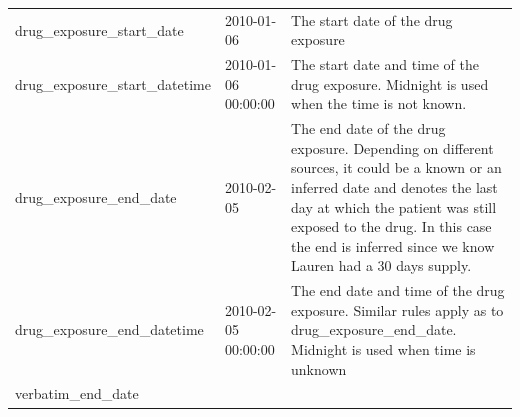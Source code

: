 \documentclass[]{book}
\begin{document}
\begin{longtable}[]{@{}lll@{}}
\begin{minipage}[t]{0.30\columnwidth}
drug\_exposure\_start\_date\strut
\end{minipage} & \begin{minipage}[t]{0.14\columnwidth}\raggedright
2010-01-06\strut
\end{minipage} & \begin{minipage}[t]{0.48\columnwidth}\raggedright
The start date of the drug exposure\strut
\end{minipage}\tabularnewline
\begin{minipage}[t]{0.30\columnwidth}\raggedright
drug\_exposure\_start\_datetime\strut
\end{minipage} & \begin{minipage}[t]{0.14\columnwidth}\raggedright
2010-01-06 00:00:00\strut
\end{minipage} & \begin{minipage}[t]{0.48\columnwidth}\raggedright
The start date and time of the drug exposure. Midnight is used when the time is not known.\strut
\end{minipage}\tabularnewline
\begin{minipage}[t]{0.30\columnwidth}\raggedright
drug\_exposure\_end\_date\strut
\end{minipage} & \begin{minipage}[t]{0.14\columnwidth}\raggedright
2010-02-05\strut
\end{minipage} & \begin{minipage}[t]{0.48\columnwidth}\raggedright
The end date of the drug exposure. Depending on different sources, it could be a known or an inferred date and denotes the last day at which the patient was still exposed to the drug. In this case the end is inferred since we know Lauren had a 30 days supply.\strut
\end{minipage}\tabularnewline
\begin{minipage}[t]{0.30\columnwidth}\raggedright
drug\_exposure\_end\_datetime\strut
\end{minipage} & \begin{minipage}[t]{0.14\columnwidth}\raggedright
2010-02-05 00:00:00\strut
\end{minipage} & \begin{minipage}[t]{0.48\columnwidth}\raggedright
The end date and time of the drug exposure. Similar rules apply as to drug\_exposure\_end\_date. Midnight is used when time is unknown\strut
\end{minipage}\tabularnewline
\begin{minipage}[t]{0.30\columnwidth}\raggedright
verbatim\_end\_date\strut

\end{minipage}
\end{longtable}
\end{document}

